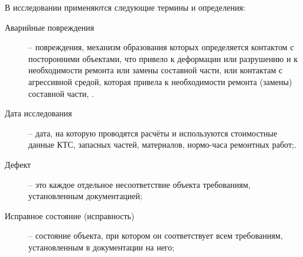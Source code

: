 В исследовании применяются следующие термины и определения:
\begin{description}
	\item
	[Аварийные повреждения] -- повреждения, механизм образования которых определяется контактом с посторонними объектами, что привело к деформации или разрушению и к необходимости ремонта или замены составной части, или контактам с агрессивной средой, которая привела к необходимости ремонта (замены) составной части, \cite[часть II, п. 1.5]{minust:2018}.
	\item
	[Дата исследования]-- дата, на которую проводятся расчёты и используются стоимостные данные КТС, запасных частей, материалов, нормо-часа ремонтных работ;\autocite[часть II, п. 1.5]{dor:2016}.%
	\item
	[Дефект] -- это каждое отдельное несоответствие объекта требованиям, установленным документацией; \autocite{18322:gost}
	\item
	[Исправное состояние (исправность)] -- состояние объекта, при котором он соответствует всем требованиям, установленным в документации на него;

\end{description}
